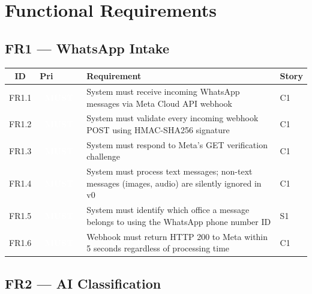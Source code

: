 \documentclass[11pt, a4paper]{article}
\newcommand{\must}{\textcolor{white}{\colorbox{mustcol}{\textbf{\ MUST\ }}}}
\begin{document}
\newpage

\section{Functional Requirements}

\subsection{FR1 --- WhatsApp Intake}

\begin{tabularx}{\linewidth}{clXl}
\toprule
\textbf{ID} & \textbf{Pri} & \textbf{Requirement} & \textbf{Story} \\
\midrule
FR1.1 & \must   & System must receive incoming WhatsApp messages via Meta Cloud API webhook & C1 \\
FR1.2 & \must   & System must validate every incoming webhook POST using HMAC-SHA256 signature & C1 \\
FR1.3 & \must   & System must respond to Meta's GET verification challenge & C1 \\
FR1.4 & \must   & System must process text messages; non-text messages (images, audio) are silently ignored in v0 & C1 \\
FR1.5 & \must   & System must identify which office a message belongs to using the WhatsApp phone number ID & S1 \\
FR1.6 & \must   & Webhook must return HTTP 200 to Meta within 5 seconds regardless of processing time & C1 \\
\bottomrule
\end{tabularx}

\subsection{FR2 --- AI Classification}
\end{document}
